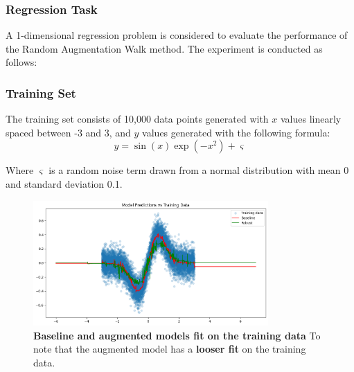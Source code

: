 \subsubsection{\textbf{Regression Task}}

A 1-dimensional regression problem is considered to evaluate the performance of the Random Augmentation Walk method. The experiment is conducted as follows:

\subsubsection{Training Set}
The training set consists of 10,000 data points generated with $x$ values linearly spaced between -3 and 3, and $y$ values generated with the following formula:
\begin{equation}
    y = \sin(x)\exp(-x^2) + \varsigma
\end{equation}

Where $\varsigma$ is a random noise term drawn from a normal distribution with mean 0 and standard deviation 0.1.

\begin{figure}[H]
    \centering
    \includegraphics[width=0.8\textwidth]{assets/fit_on_train.png} 
    \caption{\textbf{Baseline and augmented models fit on the training data} To note that the augmented model has a \textbf{looser fit} on the training data.}
    \label{fig:fit-train}
\end{figure}

